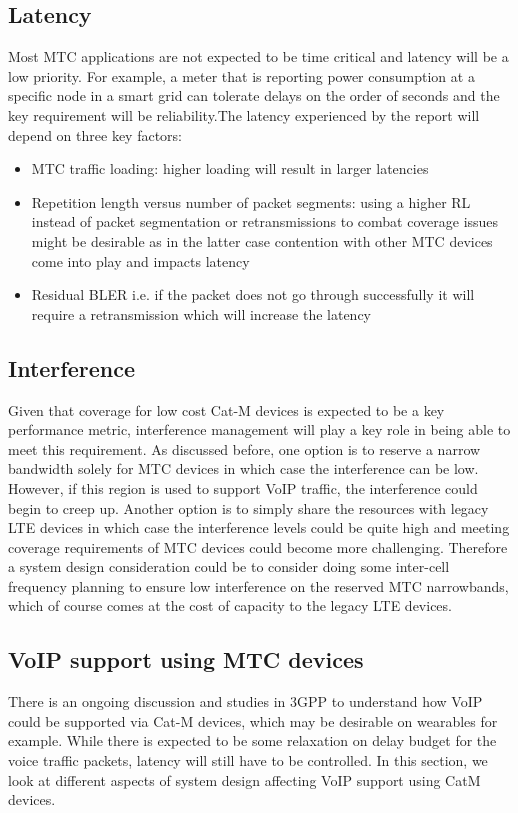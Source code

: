 \documentclass[conference,compsoc]{IEEEtran}
\begin{document}
\subsection{Latency}
Most MTC applications are not expected to be time critical and latency will be a low priority. For example, a meter that is reporting power consumption at a specific node in a smart grid can tolerate delays on the order of seconds and the key requirement will be reliability.The latency experienced by the report will depend on three key factors:
\begin{itemize}
    \item{MTC traffic loading: higher loading will result in larger latencies}
    \item{Repetition length versus number of packet segments: using a higher RL instead of packet segmentation or retransmissions to combat coverage issues might be desirable as in the latter case contention with other MTC devices come into play and impacts latency}
    \item{Residual BLER i.e. if the packet does not go through successfully it will require a retransmission which will increase the latency}
\end{itemize}

\subsection{Interference}
Given that coverage for low cost Cat-M devices is expected to be a key performance metric, interference management will play a key role in being able to meet this requirement. As discussed before, one option is to reserve a narrow bandwidth solely for MTC devices in which case the interference can be low. However, if this region is used to support VoIP traffic, the interference could begin to creep up. Another option is to simply share the resources with legacy LTE devices in which case the interference levels could be quite high and meeting coverage requirements of MTC devices could become more challenging. Therefore a system design consideration could be to consider doing some inter-cell frequency planning to ensure low interference on the reserved MTC narrowbands, which of course comes at the cost of capacity to the legacy LTE devices.

\subsection{VoIP support using MTC devices}
There is an ongoing discussion and studies in 3GPP to understand how VoIP could be supported via Cat-M devices, which may be desirable on wearables for example. While there is expected to be some relaxation on delay budget for the voice traffic packets, latency will still have to be controlled. In this section, we look at different aspects of system design affecting VoIP support using CatM devices. 
\end{document}

